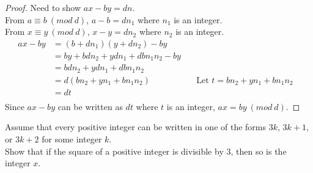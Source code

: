 \documentclass[6pt]{article}
\begin{document}
\begin{proof}
Need to show $ax - by = dn$. \\
From $a \equiv b\ (mod\ d)$, $a - b = dn_1$ where $n_1$ is an integer. \\
From $x \equiv y\ (mod\ d)$, $x - y = dn_2$ where $n_2$ is an integer.
\begin{align*}
ax - by &= (b + dn_1)(y + dn_2) - by && \\
&= by + bdn_2 + ydn_1 + dbn_1n_2 - by && \\
&= bdn_2 + ydn_1 + dbn_1n_2 && \\
&= d(bn_2 + yn_1 + bn_1n_2) & \quad \text{Let $t = bn_2 + yn_1 + bn_1n_2$} \\
&= dt && \\
\end{align*}
Since $ax - by$ can be written as $dt$ where $t$ is an integer, $ax = by\ (mod\ d)$.
\end{proof}


\begin{tcolorbox}[title=Problem 26, breakable]
Assume that every positive integer can be written in one of the forms
$3k$, $3k + 1$, or $3k + 2$ for some integer $k$.\\ 
Show that if the square of a positive integer is divisible by $3$,
then so is the integer $x$.
\end{tcolorbox}
\end{document}
